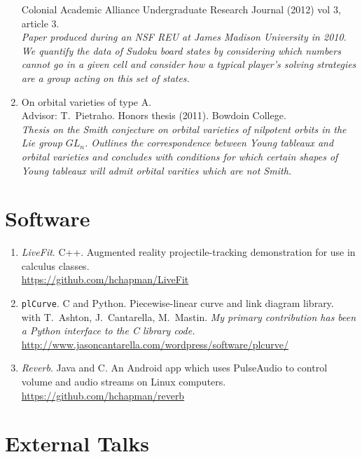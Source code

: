 \documentclass[letterpaper]{article}
\begin{document}
\begin{enumerate}
  Colonial Academic Alliance Undergraduate Research Journal (2012) vol
  3, article 3.\\
  \textit{Paper produced during an NSF REU at James Madison University
    in 2010. We quantify the data of Sudoku board states by
    considering which numbers \emph{cannot} go in a given cell and
    consider how a typical player's solving strategies are a group
    acting on this set of states.}
\item On orbital varieties of type A. \\
  Advisor: T.\ Pietraho. Honors thesis (2011). Bowdoin
  College. \\
  \textit{Thesis on the Smith conjecture on orbital varieties of
    nilpotent orbits in the Lie group $GL_n$.  Outlines the
    correspondence between Young tableaux and orbital varieties and
    concludes with conditions for which certain shapes of Young
    tableaux will admit orbital varities which are not Smith.}
\end{enumerate}

\section*{Software}

\begin{enumerate}
\item \emph{LiveFit}. C++. Augmented reality projectile-tracking demonstration
  for use in calculus classes. \\
  \url{https://github.com/hchapman/LiveFit}
\item \texttt{plCurve}. C and Python. Piecewise-linear curve and link diagram library.\\
  with T.\ Ashton, J.\ Cantarella, M.\ Mastin.
  \textit{My primary contribution has been a Python interface to the C
    library code.} \\
  \url{http://www.jasoncantarella.com/wordpress/software/plcurve/}
\item \emph{Reverb}. Java and C. An Android app which uses PulseAudio to
  control volume and audio streams on Linux computers. \\
  \url{https://github.com/hchapman/reverb}
\end{enumerate}

\section*{External Talks}
\end{document}
